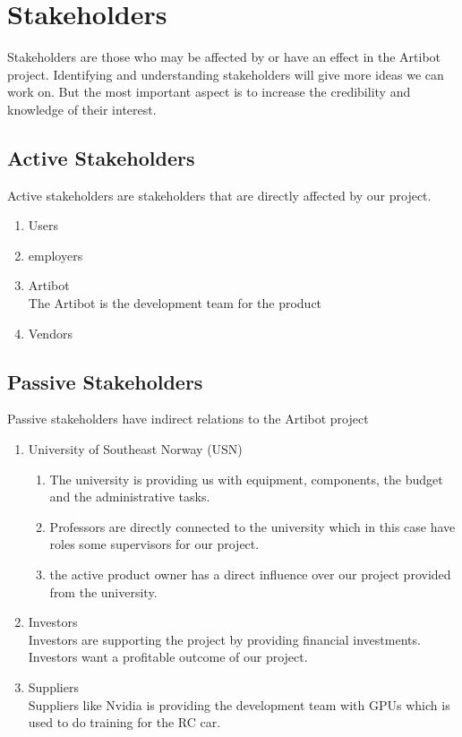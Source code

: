 \documentclass{article}
\begin{document}
\section{Stakeholders} 
Stakeholders are those who may be affected by or have an effect in the Artibot project. Identifying and understanding stakeholders will give more ideas we can work on. But the most important aspect is to increase the credibility and knowledge of their interest. 

\subsection{Active Stakeholders} 


Active stakeholders are stakeholders that are directly affected by our project. 
\begin{enumerate}
    \item Users\\
    \item employers\\
    \item Artibot\\
        The Artibot is the development team for the product
    \item Vendors\\
        
        
\end{enumerate}

\subsection {Passive Stakeholders}
Passive stakeholders have indirect relations to the Artibot project
\begin{enumerate}
    \item University of Southeast Norway (USN)
        \begin{enumerate} 
        \item The university is providing us with equipment, components, the budget and the administrative tasks. 
        
        \item Professors are directly connected to the university which in this case have roles some supervisors for our project. 
        
        \item the active product owner has a direct influence over our project provided from the university. 
        \end{enumerate}
    
    \item Investors\\
        Investors are supporting the project by providing financial investments. Investors want a profitable outcome of our project. 
        
    \item Suppliers \\
        Suppliers like Nvidia is providing the development team with GPUs which is used to do training for the RC car. 
\end{enumerate}
\end{document}
